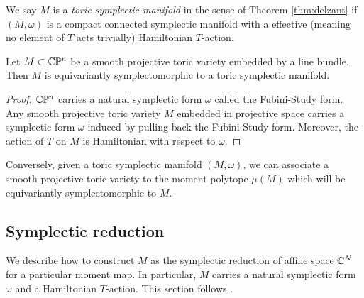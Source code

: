 We say $M$ is a \emph{toric symplectic manifold} in the sense of Theorem \ref{thm:delzant}
if $(M,\omega)$ is a compact connected symplectic manifold
with a effective (meaning no element of $T$ acts trivially) Hamiltonian $T$-action.

\begin{proposition}
    Let $M\subset \mathbb{C}\mathbb{P}^n$ be a smooth projective toric variety embedded by a line bundle.
    Then $M$ is equivariantly symplectomorphic to a toric symplectic manifold.
\end{proposition}
\begin{proof}
$\mathbb{C}\mathbb{P}^n$ carries a natural symplectic form $\omega$ 
called the Fubini-Study form. Any smooth projective toric variety $M$ embedded
in projective space carries a symplectic form $\omega$ induced by pulling 
back the Fubini-Study form. Moreover, the action of $T$ on $M$
 is Hamiltonian with respect to $\omega$.
\end{proof}

Conversely, given a toric symplectic manifold $(M,\omega)$, we can associate a 
smooth projective toric variety to the moment polytope $\mu(M)$ which will be
equivariantly symplectomorphic to $M$.

\subsection{Symplectic reduction}
We describe how to construct $M$ as the symplectic reduction of affine space $\mathbb{C}^N$ for 
a particular moment map. In particular, $M$ carries a natural symplectic form $\omega$ and 
a Hamiltonian $T$-action.
This section follows \cite{lsg}. 

